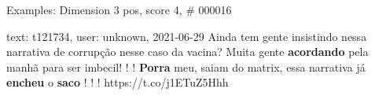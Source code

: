 \begin{frame}{Examples: Dimension 3 pos, score 4, \# 000016}
\footnotesize
\begin{exampleblock}{text: t121734, user: unknown, 2021-06-29}
Ainda tem gente insistindo nessa narrativa de corrupção nesse caso da vacina? 
Muita gente \textbf{acordando} pela manhã para ser imbecil! ! ! \textbf{Porra} 
meu, saiam do matrix, essa narrativa já \textbf{encheu} o \textbf{saco} ! ! ! 
https://t.co/j1ETuZ5Hhh 
\end{exampleblock}
\end{frame}
